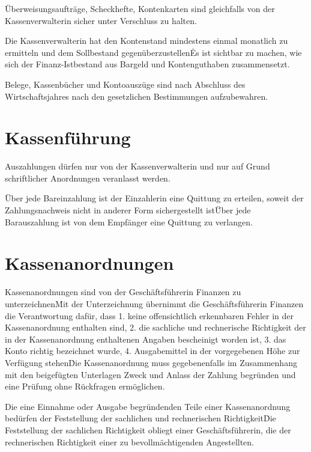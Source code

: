 \begin{multicols}{2}
\Abs \Satz Überweisungsaufträge, Scheckhefte, Kontenkarten sind gleichfalls von der Kassenverwalterin sicher unter Verschluss zu halten.

\Abs \Satz Die Kassenverwalterin hat den Kontenstand mindestens einmal monatlich zu ermitteln und dem Sollbestand gegenüberzustellen\. Es ist sichtbar zu machen, wie sich der Finanz-Istbestand aus Bargeld und Kontenguthaben zusammensetzt.

\Abs \Satz Belege, Kassenbücher und Kontoauszüge sind nach Abschluss des Wirtschaftsjahres nach den gesetzlichen Bestimmungen aufzubewahren.



\section{Kassenführung}

\Abs \Satz Auszahlungen dürfen nur von der Kassenverwalterin und nur auf Grund schriftlicher Anordnungen veranlasst werden.

\Abs \Satz Über jede Bareinzahlung ist der Einzahlerin eine Quittung zu erteilen, soweit der Zahlungsnachweis nicht in anderer Form sichergestellt ist\. Über jede Barauszahlung ist von dem Empfänger eine Quittung zu verlangen.



\section{Kassenanordnungen}

\Abs \Satz Kassenanordnungen sind von der Geschäftsführerin Finanzen zu unterzeichnen\. Mit der Unterzeichnung übernimmt die Geschäftsführerin Finanzen die Verantwortung dafür, dass
1. keine offensichtlich erkennbaren Fehler in der Kassenanordnung enthalten sind,
2. die sachliche und rechnerische Richtigkeit der in der Kassenanordnung enthaltenen Angaben bescheinigt worden ist,
3. das Konto richtig bezeichnet wurde,
4. Ausgabemittel in der vorgegebenen Höhe zur Verfügung stehen\.
Die Kassenanordnung muss gegebenenfalls im Zusammenhang mit den beigefügten Unterlagen Zweck und Anlass der Zahlung begründen und eine Prüfung ohne Rückfragen ermöglichen.

\Abs \Satz Die eine Einnahme oder Ausgabe begründenden Teile einer Kassenanordnung bedürfen der Feststellung der sachlichen und rechnerischen Richtigkeit\. Die Feststellung der sachlichen Richtigkeit obliegt einer Geschäftsführerin, die der rechnerischen Richtigkeit einer zu bevollmächtigenden Angestellten.




\end{multicols}

